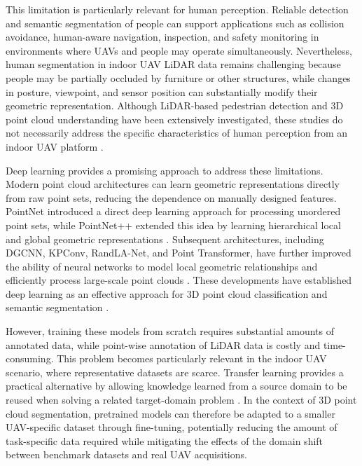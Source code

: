 This limitation is particularly relevant for human perception. Reliable detection and semantic segmentation of people can support applications such as collision avoidance, human-aware navigation, inspection, and safety monitoring in environments where UAVs and people may operate simultaneously. Nevertheless, human segmentation in indoor UAV LiDAR data remains challenging because people may be partially occluded by furniture or other structures, while changes in posture, viewpoint, and sensor position can substantially modify their geometric representation. Although LiDAR-based pedestrian detection and 3D point cloud understanding have been extensively investigated, these studies do not necessarily address the specific characteristics of human perception from an indoor UAV platform \cite{Ferreira2023PedestrianLiDAR,Lorente2021PedestrianPointNet}.

Deep learning provides a promising approach to address these limitations. Modern point cloud architectures can learn geometric representations directly from raw point sets, reducing the dependence on manually designed features. PointNet introduced a direct deep learning approach for processing unordered point sets, while PointNet++ extended this idea by learning hierarchical local and global geometric representations \cite{Qi2017PointNet,Qi2017PointNetPP}. Subsequent architectures, including DGCNN, KPConv, RandLA-Net, and Point Transformer, have further improved the ability of neural networks to model local geometric relationships and efficiently process large-scale point clouds \cite{Wang2019DGCNN,Thomas2019KPConv,Hu2020RandLANet,Zhao2021PointTransformer}. These developments have established deep learning as an effective approach for 3D point cloud classification and semantic segmentation \cite{Guo2020DeepLearningSurvey}.

However, training these models from scratch requires substantial amounts of annotated data, while point-wise annotation of LiDAR data is costly and time-consuming. This problem becomes particularly relevant in the indoor UAV scenario, where representative datasets are scarce. Transfer learning provides a practical alternative by allowing knowledge learned from a source domain to be reused when solving a related target-domain problem \cite{pan2010survey}. In the context of 3D point cloud segmentation, pretrained models can therefore be adapted to a smaller UAV-specific dataset through fine-tuning, potentially reducing the amount of task-specific data required while mitigating the effects of the domain shift between benchmark datasets and real UAV acquisitions.

